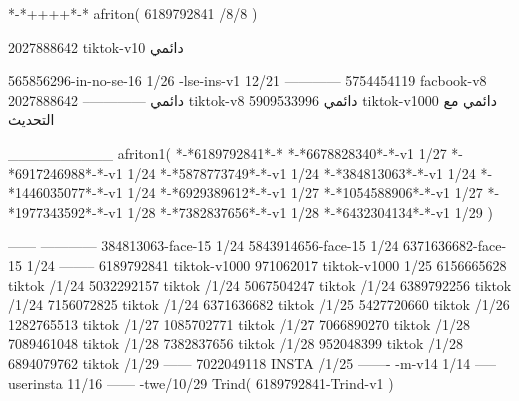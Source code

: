 *-*++++*-*
afriton(
6189792841 /8/8
)

2027888642 tiktok-v10
دائمي

565856296-in-no-se-16 1/26
-lse-ins-v1 12/21
------------
5754454119 facbook-v8
دائمي
--------------
2027888642 tiktok-v8
دائمي
5909533996 tiktok-v1000
دائمي مع التحديث

__________
afriton1(
*-*6189792841*-*
*-*6678828340*-*-v1 1/27
*-*6917246988*-*-v1 1/24
*-*5878773749*-*-v1 1/24
*-*384813063*-*-v1 1/24
*-*1446035077*-*-v1 1/24
*-*6929389612*-*-v1 1/27
*-*1054588906*-*-v1 1/27
*-*1977343592*-*-v1 1/28
*-*7382837656*-*-v1 1/28
*-*6432304134*-*-v1 1/29
)

------
------------
384813063-face-15 1/24
5843914656-face-15 1/24
6371636682-face-15 1/24
--------
6189792841 tiktok-v1000
971062017 tiktok-v1000 1/25
6156665628 tiktok /1/24
5032292157 tiktok /1/24
5067504247 tiktok /1/24
6389792256 tiktok /1/24
7156072825 tiktok /1/24
6371636682 tiktok /1/25
5427720660 tiktok /1/26
1282765513 tiktok /1/27
1085702771 tiktok /1/27
7066890270 tiktok /1/28
7089461048 tiktok /1/28
7382837656 tiktok /1/28
952048399 tiktok /1/28
6894079762 tiktok /1/29
------
7022049118 INSTA /1/25
-------
-m-v14 1/14
-----
userinsta 11/16
------
-twe/10/29
Trind(
6189792841-Trind-v1 
)
